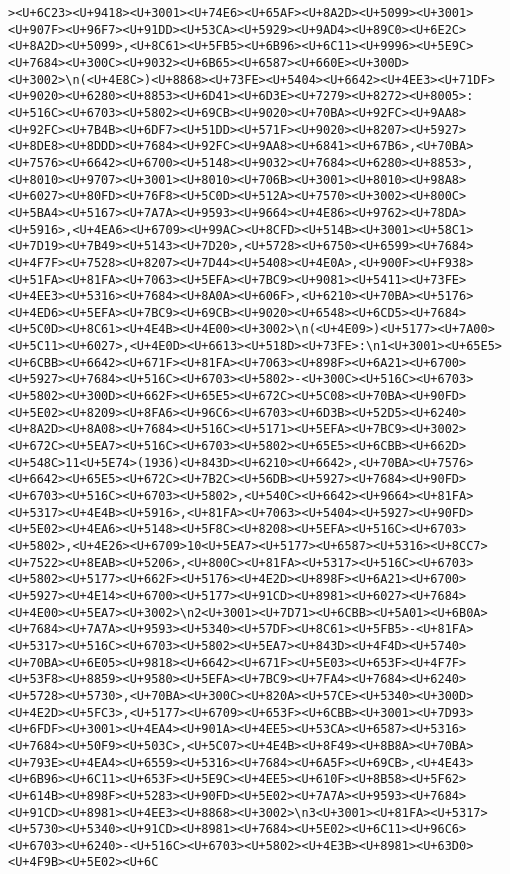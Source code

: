 \documentclass[
]{article}
\begin{document}
\begin{verbatim}
><U+6C23><U+9418><U+3001><U+74E6><U+65AF><U+8A2D><U+5099><U+3001><U+907F><U+96F7><U+91DD><U+53CA><U+5929><U+9AD4><U+89C0><U+6E2C><U+8A2D><U+5099>,<U+8C61><U+5FB5><U+6B96><U+6C11><U+9996><U+5E9C><U+7684><U+300C><U+9032><U+6B65><U+6587><U+660E><U+300D><U+3002>\n(<U+4E8C>)<U+8868><U+73FE><U+5404><U+6642><U+4EE3><U+71DF><U+9020><U+6280><U+8853><U+6D41><U+6D3E><U+7279><U+8272><U+8005>:<U+516C><U+6703><U+5802><U+69CB><U+9020><U+70BA><U+92FC><U+9AA8><U+92FC><U+7B4B><U+6DF7><U+51DD><U+571F><U+9020><U+8207><U+5927><U+8DE8><U+8DDD><U+7684><U+92FC><U+9AA8><U+6841><U+67B6>,<U+70BA><U+7576><U+6642><U+6700><U+5148><U+9032><U+7684><U+6280><U+8853>,<U+8010><U+9707><U+3001><U+8010><U+706B><U+3001><U+8010><U+98A8><U+6027><U+80FD><U+76F8><U+5C0D><U+512A><U+7570><U+3002><U+800C><U+5BA4><U+5167><U+7A7A><U+9593><U+9664><U+4E86><U+9762><U+78DA><U+5916>,<U+4EA6><U+6709><U+99AC><U+8CFD><U+514B><U+3001><U+58C1><U+7D19><U+7B49><U+5143><U+7D20>,<U+5728><U+6750><U+6599><U+7684><U+4F7F><U+7528><U+8207><U+7D44><U+5408><U+4E0A>,<U+900F><U+F938><U+51FA><U+81FA><U+7063><U+5EFA><U+7BC9><U+9081><U+5411><U+73FE><U+4EE3><U+5316><U+7684><U+8A0A><U+606F>,<U+6210><U+70BA><U+5176><U+4ED6><U+5EFA><U+7BC9><U+69CB><U+9020><U+6548><U+6CD5><U+7684><U+5C0D><U+8C61><U+4E4B><U+4E00><U+3002>\n(<U+4E09>)<U+5177><U+7A00><U+5C11><U+6027>,<U+4E0D><U+6613><U+518D><U+73FE>:\n1<U+3001><U+65E5><U+6CBB><U+6642><U+671F><U+81FA><U+7063><U+898F><U+6A21><U+6700><U+5927><U+7684><U+516C><U+6703><U+5802>-<U+300C><U+516C><U+6703><U+5802><U+300D><U+662F><U+65E5><U+672C><U+5C08><U+70BA><U+90FD><U+5E02><U+8209><U+8FA6><U+96C6><U+6703><U+6D3B><U+52D5><U+6240><U+8A2D><U+8A08><U+7684><U+516C><U+5171><U+5EFA><U+7BC9><U+3002><U+672C><U+5EA7><U+516C><U+6703><U+5802><U+65E5><U+6CBB><U+662D><U+548C>11<U+5E74>(1936)<U+843D><U+6210><U+6642>,<U+70BA><U+7576><U+6642><U+65E5><U+672C><U+7B2C><U+56DB><U+5927><U+7684><U+90FD><U+6703><U+516C><U+6703><U+5802>,<U+540C><U+6642><U+9664><U+81FA><U+5317><U+4E4B><U+5916>,<U+81FA><U+7063><U+5404><U+5927><U+90FD><U+5E02><U+4EA6><U+5148><U+5F8C><U+8208><U+5EFA><U+516C><U+6703><U+5802>,<U+4E26><U+6709>10<U+5EA7><U+5177><U+6587><U+5316><U+8CC7><U+7522><U+8EAB><U+5206>,<U+800C><U+81FA><U+5317><U+516C><U+6703><U+5802><U+5177><U+662F><U+5176><U+4E2D><U+898F><U+6A21><U+6700><U+5927><U+4E14><U+6700><U+5177><U+91CD><U+8981><U+6027><U+7684><U+4E00><U+5EA7><U+3002>\n2<U+3001><U+7D71><U+6CBB><U+5A01><U+6B0A><U+7684><U+7A7A><U+9593><U+5340><U+57DF><U+8C61><U+5FB5>-<U+81FA><U+5317><U+516C><U+6703><U+5802><U+5EA7><U+843D><U+4F4D><U+5740><U+70BA><U+6E05><U+9818><U+6642><U+671F><U+5E03><U+653F><U+4F7F><U+53F8><U+8859><U+9580><U+5EFA><U+7BC9><U+7FA4><U+7684><U+6240><U+5728><U+5730>,<U+70BA><U+300C><U+820A><U+57CE><U+5340><U+300D><U+4E2D><U+5FC3>,<U+5177><U+6709><U+653F><U+6CBB><U+3001><U+7D93><U+6FDF><U+3001><U+4EA4><U+901A><U+4EE5><U+53CA><U+6587><U+5316><U+7684><U+50F9><U+503C>,<U+5C07><U+4E4B><U+8F49><U+8B8A><U+70BA><U+793E><U+4EA4><U+6559><U+5316><U+7684><U+6A5F><U+69CB>,<U+4E43><U+6B96><U+6C11><U+653F><U+5E9C><U+4EE5><U+610F><U+8B58><U+5F62><U+614B><U+898F><U+5283><U+90FD><U+5E02><U+7A7A><U+9593><U+7684><U+91CD><U+8981><U+4EE3><U+8868><U+3002>\n3<U+3001><U+81FA><U+5317><U+5730><U+5340><U+91CD><U+8981><U+7684><U+5E02><U+6C11><U+96C6><U+6703><U+6240>-<U+516C><U+6703><U+5802><U+4E3B><U+8981><U+63D0><U+4F9B><U+5E02><U+6C
\end{verbatim}
\end{document}
